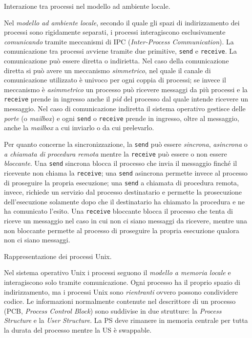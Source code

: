 \documentclass[answers,a4paper,12pt]{exam}
\begin{document}
\begin{questions}
\question
Interazione tra processi nel modello ad ambiente locale.
\begin{solutionorlines}[3.8in]
Nel \textit{modello ad ambiente locale}, secondo il quale gli spazi di indirizzamento dei processi sono rigidamente separati, i processi interagiscono esclusivamente \textit{comunicando} tramite meccanismi di IPC (\textit{Inter-Process Communication}). La comunicazione tra processi avviene tramite due primitive, \texttt{send} e \texttt{receive}. La comunicazione può essere diretta o indirietta. 
Nel caso della comunicazione diretta si può avere un meccanismo \textit{simmetrico}, nel quale il canale di comunicazione utilizzato è univoco per ogni coppia di processi; se invece il meccanismo è \textit{asimmetrico} un processo può ricevere messaggi da più processi e la \texttt{receive} prende in ingresso anche il \textit{pid} del processo dal quale intende ricevere un messaggio. Nel caso di comunicazione indiretta il sistema operativo gestisce delle \textit{porte} (o \textit{mailbox}) e ogni \texttt{send} o \texttt{receive} prende in ingresso, oltre al messaggio, anche la \textit{mailbox} a cui inviarlo o da cui prelevarlo.

Per quanto concerne la sincronizzazione, la \texttt{send} può essere \textit{sincrona}, \textit{asincrona} o \textit{a chiamata di procedura remota} mentre la \texttt{receive} può essere o non essere \textit{bloccante}. Una \texttt{send} sincrona blocca il processo che invia il messaggio finché il ricevente non chiama la \texttt{receive}; una \texttt{send} asincrona permette invece al processo di proseguire la propria esecuzione; una \texttt{send} a chiamata di procedura remota, invece, richiede un servizio dal processo destinatario e permette la prosecuzione dell'esecuzione solamente dopo che il destinatario ha chiamato la procedura e ne ha comunicato l'esito. Una \texttt{receive} bloccante blocca il processo che tenta di riceve un messaggio nel caso in cui non ci siano messaggi da ricevere, mentre una non bloccante permette al processo di proseguire la propria esecuzione qualora non ci siano messaggi. 

\end{solutionorlines}


\question
Rappresentazione dei processi Unix.
\begin{solutionorlines}[3.8in]
Nel sistema operativo Unix i processi seguono il \textit{modello a memoria locale} e interagiscono solo tramite comunicazione. Ogni processo ha il proprio spazio di indirizzamento, ma i processi Unix sono \textit{rientranti} ovvero possono condividere codice. Le informazioni normalmente contenute nel descrittore di un processo (PCB, \textit{Process Control Block}) sono suddivise in due strutture: la \textit{Process Structure} e la \textit{User Structure}. La PS deve rimanere in memoria centrale per tutta la durata del processo mentre la US è swappable. 


\end{solutionorlines}
\end{questions}
\end{document}

